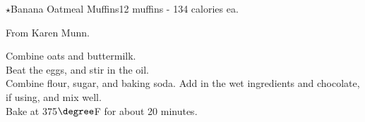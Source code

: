 \begin{recipe}{$\star$Banana Oatmeal Muffins}{12 muffins - 134 calories ea.}{}

\freeform From Karen Munn.


Combine oats and buttermilk.\\

Beat the eggs, and stir in the oil.\\

Combine flour, sugar, and baking soda. Add in the wet ingredients and chocolate, if using, and mix well.\\

Bake at 375$\degree$F for about 20 minutes.

\end{recipe}